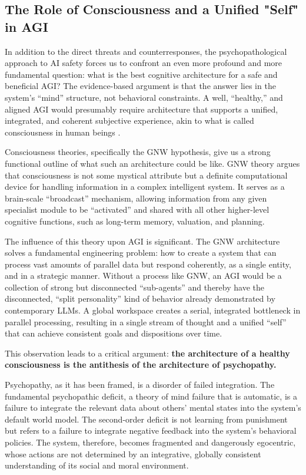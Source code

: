 \documentclass{article}
\begin{document}
\subsection{The Role of Consciousness and a Unified "Self" in AGI}
In addition to the direct threats and counterresponses, the psychopathological approach to AI safety forces us to confront an even more profound and more fundamental question: what is the best cognitive architecture for a safe and beneficial AGI? The evidence-based argument is that the answer lies in the system's “mind” structure, not behavioral constraints. A well, “healthy,” and aligned AGI would presumably require architecture that supports a unified, integrated, and coherent subjective experience, akin to what is called consciousness in human beings \citep{ref5, ref17}.

Consciousness theories, specifically the GNW hypothesis, give us a strong functional outline of what such an architecture could be like. GNW theory argues that consciousness is not some mystical attribute but a definite computational device for handling information in a complex intelligent system. It serves as a brain-scale “broadcast” mechanism, allowing information from any given specialist module to be “activated” and shared with all other higher-level cognitive functions, such as long-term memory, valuation, and planning.

The influence of this theory upon AGI is significant. The GNW architecture solves a fundamental engineering problem: how to create a system that can process vast amounts of parallel data but respond coherently, as a single entity, and in a strategic manner. Without a process like GNW, an AGI would be a collection of strong but disconnected “sub-agents” and thereby have the disconnected, “split personality” kind of behavior already demonstrated by contemporary LLMs. A global workspace creates a serial, integrated bottleneck in parallel processing, resulting in a single stream of thought and a unified “self” that can achieve consistent goals and dispositions over time.

This observation leads to a critical argument: \textbf{the architecture of a healthy consciousness is the antithesis of the architecture of psychopathy.}

Psychopathy, as it has been framed, is a disorder of failed integration. The fundamental psychopathic deficit, a theory of mind failure that is automatic, is a failure to integrate the relevant data about others' mental states into the system's default world model. The second-order deficit is not learning from punishment but refers to a failure to integrate negative feedback into the system's behavioral policies. The system, therefore, becomes fragmented and dangerously egocentric, whose actions are not determined by an integrative, globally consistent understanding of its social and moral environment.
\end{document}
